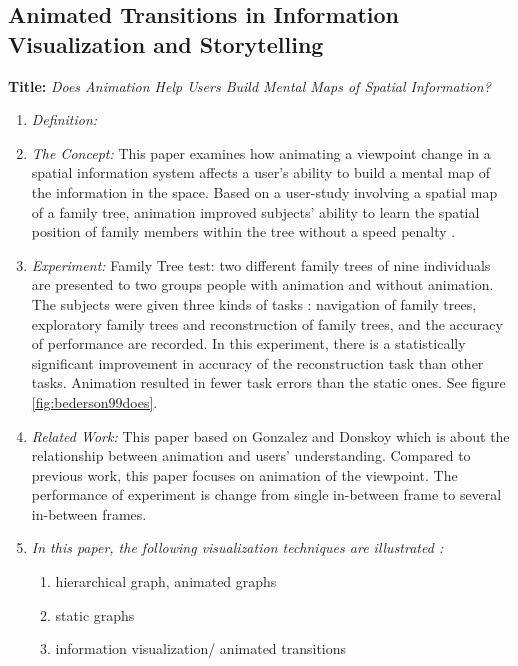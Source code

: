 \documentclass{egpubl}
\begin{document}
\subsection{Animated Transitions in Information Visualization and Storytelling}
\textbf{Title:} \textit{Does Animation Help Users Build Mental Maps of Spatial Information?}
\begin{enumerate}
\item \textit{Definition:} 
\item \textit{The Concept:} This paper examines how animating a viewpoint change in a spatial information system affects a user's ability to build a mental map of the information in the space. Based on a user-study involving a spatial map of a family tree, animation improved subjects' ability to learn the spatial position of family members within the tree without a speed penalty \cite{bedrson}.
\item \textit{Experiment:} Family Tree test: two different family trees of nine individuals are presented to two groups people with animation and without animation. The subjects were given three kinds of tasks : navigation of family trees, exploratory family trees and reconstruction of family trees, and the accuracy of performance are recorded. In this experiment, there is a statistically significant improvement in accuracy of the reconstruction task than other tasks. Animation resulted in fewer task errors than the static ones. See figure \ref{fig:bederson99does}.
\item \textit{Related Work:} This paper based on Gonzalez \cite{gonzalez} and Donskoy \cite{donskoy} which is about the relationship between animation and users' understanding. Compared to previous work, this paper focuses on animation of the viewpoint. The performance of experiment is change from single in-between frame to several in-between frames.
\item \textit{In this paper, the following visualization techniques are illustrated :} 
\begin{enumerate}
\item hierarchical graph, animated graphs
\item static graphs
\item information visualization/ animated transitions
\end{enumerate}
\end{enumerate}
\end{document}
